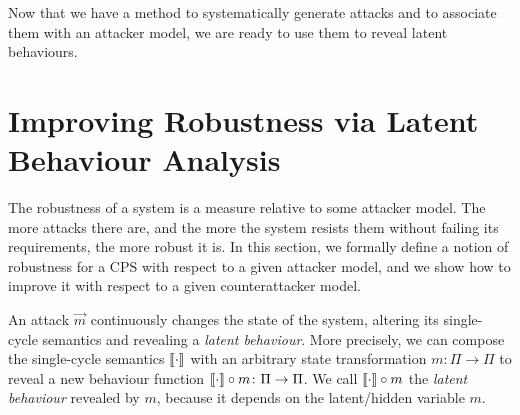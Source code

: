 {{%

Now that we have a method to systematically generate attacks and to associate them with an attacker model, we are ready to use them to reveal latent behaviours. 

\section{Improving Robustness via Latent Behaviour Analysis}
\label{sec:LatentBehaviours}
The robustness of a system is a measure relative to some attacker model. The more attacks there are, and the more the system resists them without failing its requirements, the more robust it is. In this section, we formally define a notion of robustness for a CPS with respect to a given attacker model, and we show how to improve it with respect to a given counterattacker model.

An attack $\vec{m}$ continuously changes the state of the system, altering its single-cycle semantics and revealing a \emph{latent behaviour}. More precisely, we can compose the single-cycle semantics ${{{\llbracket\cdot\rrbracket}}}$ with an arbitrary state transformation $m\colon \Pi\rightarrow\Pi$ to reveal a new behaviour function ${{{\llbracket\cdot\rrbracket}}}\circ m\colon\Pi\rightarrow\Pi$. We call ${{{\llbracket\cdot\rrbracket}}}\circ m$ the \emph{latent behaviour} revealed by $m$, because it depends on the latent/hidden variable $m$. 

}}
